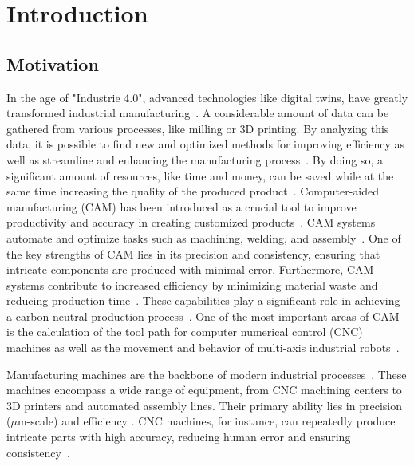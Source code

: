 \chapter{Introduction}%
\section{Motivation}%

In the age of "Industrie 4.0", advanced technologies like digital twins, have greatly transformed industrial manufacturing~\cite{Singh.2021}. A considerable amount of data can be gathered from various processes, like milling or 3D printing. By analyzing this data, it is possible to find new and optimized methods for improving efficiency as well as streamline and enhancing the manufacturing process~\cite{Ghobakhloo.2020}. By doing so, a significant amount of resources, like time and money, can be saved while at the same time increasing the quality of the produced product~\cite{Bibby.2018,Simonis.2016}.
Computer-aided manufacturing (\acrshort{CAM}) has been introduced as a crucial tool to improve productivity and accuracy in creating customized products~\cite{Feldhausen.2022}. \acrshort{CAM} systems automate and optimize tasks such as machining, welding, and assembly~\cite{LalitNarayan.2013b}. One of the key strengths of \acrshort{CAM} lies in its precision and consistency, ensuring that intricate components are produced with minimal error. Furthermore, \acrshort{CAM} systems contribute to increased efficiency by minimizing material waste and reducing production time~\cite{Dubovska.2014}. These capabilities play a significant role in achieving a carbon-neutral production process~\cite{Saxena.2020}. One of the most important areas of \acrshort{CAM} is the calculation of the tool path for computer numerical control (\acrshort{CNC}) machines as well as the movement and behavior of multi-axis industrial robots~\cite{Pan}. 


Manufacturing machines are the backbone of modern industrial processes~\cite{Bi.2020}. These machines encompass a wide range of equipment, from \acrshort{CNC} machining centers to 3D printers and automated assembly lines. Their primary ability lies in precision ($\mu$m-scale) and efficiency \cite{Liberman.2021}. \acrshort{CNC} machines, for instance, can repeatedly produce intricate parts with high accuracy, reducing human error and ensuring consistency~\cite{Jia.2018}. 

